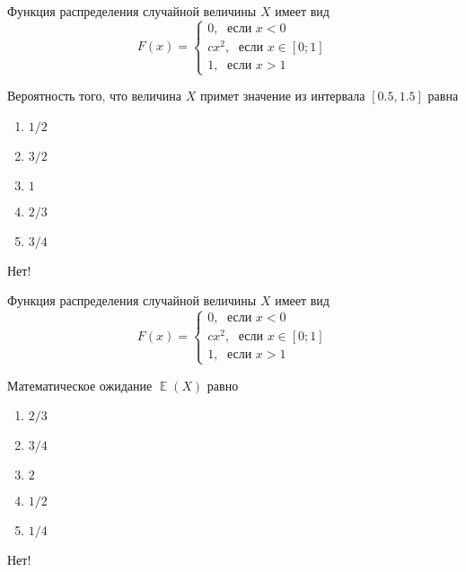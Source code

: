 \documentclass[t]{beamer}
\DeclareMathOperator{\E}{\mathbb{E}}
\begin{document}
 \begin{frame} \label{18-No} 
\begin{block}{18} 

Функция распределения случайной величины $X$ имеет вид
\[
F(x)=\begin{cases}
0, \; \text{ если } x<0 \\
cx^2, \; \text{ если } x\in [0;1] \\
1, \; \text{ если } x>1
\end{cases}
\]

\vspace{0.5cm} 
 
 
Вероятность того, что величина $X$ примет значение из интервала  $[0.5, 1.5]$ равна
 


 \end{block} 
\begin{enumerate} 
\item[] \hyperlink{18-No}{\beamergotobutton{} $1/2$}
\item[] \hyperlink{18-No}{\beamergotobutton{} $3/2$
}
\item[] \hyperlink{18-No}{\beamergotobutton{} $1$}
\item[] \hyperlink{18-No}{\beamergotobutton{} $2/3$}
\item[] \hyperlink{18-Yes}{\beamergotobutton{} $3/4$}
\end{enumerate} 

 \alert{Нет!} 
\end{frame} 


 \begin{frame} \label{19-No} 
\begin{block}{19} 

Функция распределения случайной величины $X$ имеет вид
\[
F(x)=\begin{cases}
0, \; \text{ если } x<0 \\
cx^2, \; \text{ если } x\in [0;1] \\
1, \; \text{ если } x>1
\end{cases}
\]

\vspace{0.5cm} 
 
 
Математическое ожидание $\E(X)$ равно
 


 \end{block} 
\begin{enumerate} 
\item[] \hyperlink{19-Yes}{\beamergotobutton{} $2/3$}
\item[] \hyperlink{19-No}{\beamergotobutton{} $3/4$}
\item[] \hyperlink{19-No}{\beamergotobutton{} $2$
}
\item[] \hyperlink{19-No}{\beamergotobutton{} $1/2$}
\item[] \hyperlink{19-No}{\beamergotobutton{} $1/4$}
\end{enumerate} 

 \alert{Нет!} 
\end{frame} 
\end{document}
